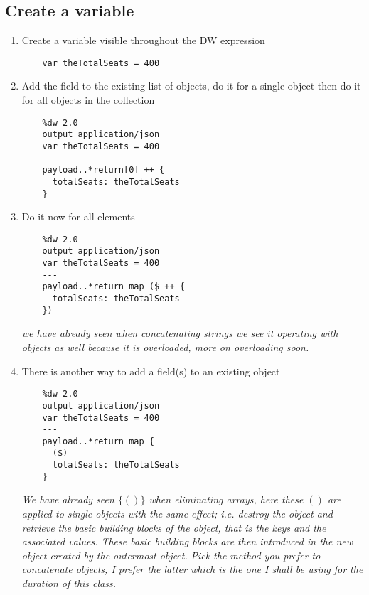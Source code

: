 \subsection{Create a variable}
\begin{enumerate}[resume*]
\item Create a variable visible throughout the DW expression
  \begin{lstlisting}
    var theTotalSeats = 400
  \end{lstlisting}
\item Add the  field to the existing list of objects, do it for a single object then do it for all objects in the collection
  \begin{lstlisting}
    %dw 2.0
    output application/json
    var theTotalSeats = 400
    ---
    payload..*return[0] ++ {
      totalSeats: theTotalSeats
    }
  \end{lstlisting}
\item Do it now for all elements
  \begin{lstlisting}
    %dw 2.0
    output application/json
    var theTotalSeats = 400
    ---
    payload..*return map ($ ++ {
      totalSeats: theTotalSeats
    })
  \end{lstlisting}
  \emph{
    \ttt{++} we have already seen when concatenating strings we see it operating with objects as well because it is overloaded, more on overloading soon.
  }
\item There is another way to add a field(s) to an existing object
  \begin{lstlisting}
    %dw 2.0
    output application/json
    var theTotalSeats = 400
    ---
    payload..*return map {
      ($)
      totalSeats: theTotalSeats
    }
  \end{lstlisting}
  \emph{
    We have already seen $\{()\}$ when eliminating arrays, here these $()$ are applied to single objects with the same effect; i.e. destroy the object and retrieve the basic building blocks of the object, that is the keys and the associated values.  These basic building blocks are then introduced in the new object created by the outermost object.}
  \newline
  \emph{
    Pick the method you prefer to concatenate objects, I prefer the latter which is the one I shall be using for the duration of this class.
  }
\end{enumerate}

